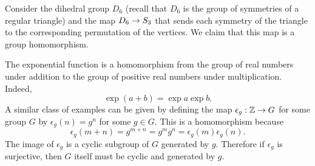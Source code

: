 \begin{example}
    Consider the dihedral group \(D_6\) (recall that \(D_6\) is the group of
    symmetries of a regular triangle) and the map \(D_6 \to S_{3}\) that
    sends each symmetry of the triangle to the corresponding permutation of the
    vertices. We claim that this map is a group homomorphism.
\end{example}

\begin{example}
    \label{ex:exponential-maps}
    The exponential function is a homomorphism from the group of real numbers
    under addition to the group of positive real numbers under multiplication.
    Indeed,
    \[
        \exp (a + b) = \exp a \exp b.
    \]
    A similar class of examples can be given by defining the map \(\epsilon_g :
    \mathbb{Z} \to G\) for some group \(G\) by \(\epsilon_g(n) = g^n\) for some \(g \in
    G\). This is a homomorphism because
    \[
        \epsilon_g(m + n) = g^{m + n} = g^m g^n = \epsilon_g(m) \epsilon_g(n).
    \]
    The image of \(\epsilon_g\) is a cyclic subgroup of \(G\) generated by
    \(g\). Therefore if \(\epsilon_g\) is surjective, then \(G\) itself must be
    cyclic and generated by \(g\).
\end{example}

